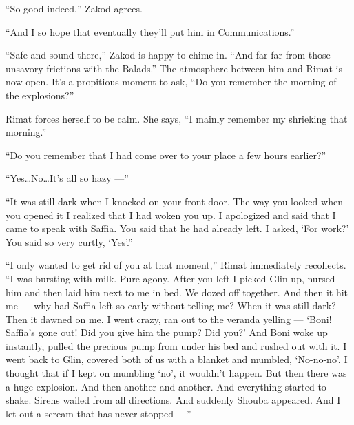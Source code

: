 \documentclass[twoside,11pt,openany]{book}
\begin{document}
``So good indeed,'' Zakod agrees.

``And I so hope that eventually they'll put him in Communications.''

``Safe and sound there,'' Zakod is happy to chime in. ``And far-far from those
unsavory frictions with the Balads.'' The atmosphere between him and Rimat is now open. It's a propitious
moment to ask, ``Do you remember the morning of the explosions?''

Rimat forces herself to be calm. She says, ``I mainly remember my shrieking that morning.''

``Do you remember that I had come over to your place a few hours earlier?''

``Yes{\ldots}No{\ldots}It's all so hazy ---''

``It was still dark when I knocked on your front door. The way you looked when you opened it I realized
that I had woken you up. I apologized and said that I came to speak with Saffia. You said that he had already left. I
asked, `For work?' You said so very curtly, `Yes'.''

``I only wanted to get rid of you at that moment,'' Rimat immediately recollects.
``I was bursting with milk. Pure agony. After you left I picked Glin up, nursed{ }him and
then laid him next to me in bed. We dozed off together. And then it hit me --- why had Saffia left so early without
telling me? When it was still dark? Then it dawned{ }on me. I went crazy, ran out to the veranda
yelling --- `Boni! Saffia's gone out! Did you give him the pump? Did you?' And Boni woke up instantly, pulled the
precious pump from under his bed and rushed out with it. I went back to Glin, covered both of us with a blanket and
mumbled, `No-no-no'. I thought that if I kept on mumbling `no', it wouldn't happen. But then there was a huge
explosion. And then another and another. And everything started to shake.  Sirens wailed from all directions. And
suddenly Shouba appeared. And I let out a scream that has never stopped ---''
\end{document}
